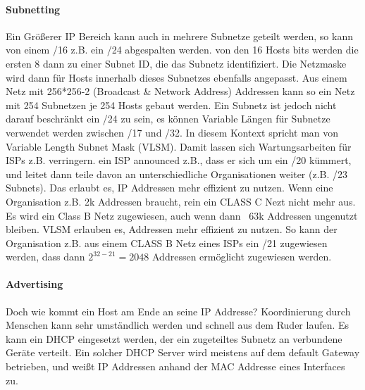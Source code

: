			\paragraph{Subnetting}
				Ein Größerer IP Bereich kann auch in mehrere Subnetze geteilt werden, so kann von einem /16 z.B. ein /24 abgespalten werden. von den 16 Hosts bits werden die ersten 8 dann zu einer Subnet ID, die das Subnetz identifiziert. Die Netzmaske wird dann für Hosts innerhalb dieses Subnetzes ebenfalls angepasst. Aus einem Netz mit 256*256-2 (Broadcast \& Network Address) Addressen kann so ein Netz mit 254 Subnetzen je 254 Hosts gebaut werden. Ein Subnetz ist jedoch nicht darauf beschränkt ein /24 zu sein, es können Variable Längen für Subnetze verwendet werden zwischen /17 und /32. In diesem Kontext spricht man von Variable Length Subnet Mask (VLSM). Damit lassen sich Wartungsarbeiten für ISPs z.B. verringern. ein ISP announced z.B., dass er sich um ein /20 kümmert, und leitet dann teile davon an unterschiedliche Organisationen weiter (z.B. /23 Subnets). Das erlaubt es, IP Addressen mehr effizient zu nutzen. Wenn eine Organisation z.B. 2k Addressen braucht, rein ein CLASS C Nezt nicht mehr aus. Es wird ein Class B Netz zugewiesen, auch wenn dann ~63k Addressen ungenutzt bleiben. VLSM erlauben es, Addressen mehr effizient zu nutzen. So kann der Organisation z.B. aus einem CLASS B Netz eines ISPs ein /21 zugewiesen werden, dass dann $2^{32-21} = 2048$ Addressen ermöglicht zugewiesen werden. 
			\paragraph{Advertising}
				Doch wie kommt ein Host am Ende an seine IP Addresse? Koordinierung durch Menschen kann sehr umständlich werden und schnell aus dem Ruder laufen. Es kann ein DHCP eingesetzt werden, der ein zugeteiltes Subnetz an verbundene Geräte verteilt. Ein solcher DHCP Server wird meistens auf dem default Gateway betrieben, und weißt IP Addressen anhand der MAC Addresse eines Interfaces zu. 

